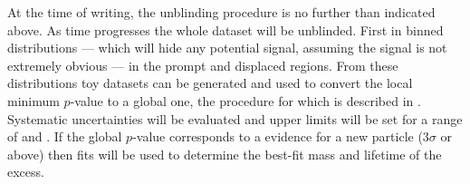 At the time of writing, the unblinding procedure is no further than indicated above.
As time progresses the whole dataset will be unblinded.
First in binned distributions
--- which will hide any potential signal, assuming the signal is not extremely obvious ---
in the prompt and displaced regions.
From these distributions toy datasets can be generated and used to convert the local minimum
$p$-value to a global one, the procedure for which is described in .
Systematic uncertainties will be evaluated and upper limits will be set for a range of \mass{\db}
and \lifetime{\db}.
If the global $p$-value corresponds to a evidence for a new particle
($3\sigma$ or above) then fits will be used to
determine the best-fit mass and lifetime of the excess.




